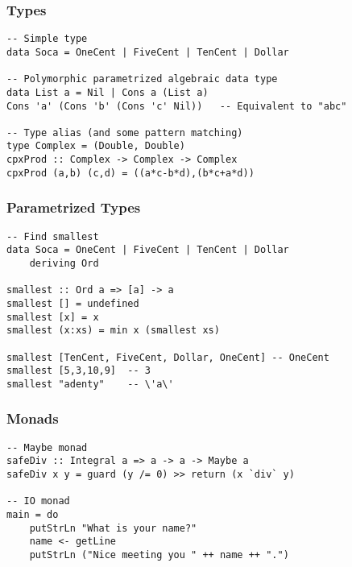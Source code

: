 \documentclass{beamer}
\begin{document}
\begin{frame}[fragile]
\frametitle{Types}
\begin{verbatim}
-- Simple type
data Soca = OneCent | FiveCent | TenCent | Dollar

-- Polymorphic parametrized algebraic data type
data List a = Nil | Cons a (List a)
Cons 'a' (Cons 'b' (Cons 'c' Nil))   -- Equivalent to "abc"

-- Type alias (and some pattern matching)
type Complex = (Double, Double)
cpxProd :: Complex -> Complex -> Complex
cpxProd (a,b) (c,d) = ((a*c-b*d),(b*c+a*d))
\end{verbatim}
\end{frame}


\begin{frame}[fragile]
\frametitle{Parametrized Types}
\begin{verbatim}
-- Find smallest
data Soca = OneCent | FiveCent | TenCent | Dollar
    deriving Ord

smallest :: Ord a => [a] -> a
smallest [] = undefined
smallest [x] = x
smallest (x:xs) = min x (smallest xs)

smallest [TenCent, FiveCent, Dollar, OneCent] -- OneCent
smallest [5,3,10,9]  -- 3
smallest "adenty"    -- \'a\'
\end{verbatim}
\end{frame}


\begin{frame}[fragile]
\frametitle{Monads}
\begin{verbatim}
-- Maybe monad
safeDiv :: Integral a => a -> a -> Maybe a
safeDiv x y = guard (y /= 0) >> return (x `div` y)

-- IO monad
main = do
    putStrLn "What is your name?"
    name <- getLine
    putStrLn ("Nice meeting you " ++ name ++ ".")
\end{verbatim}
\end{frame}
\end{document}
